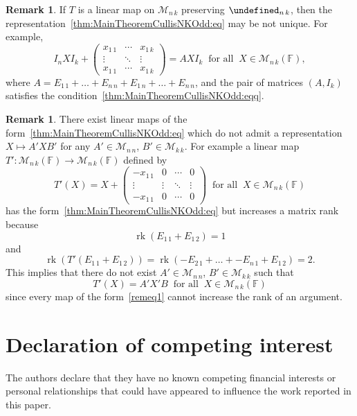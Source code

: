 \documentclass{elsarticle}
\DeclareMathOperator{\rk}{rk}
\def\F{{\mathbb F}}
\def\M{{\mathcal M}}
\let\det\undefined
\DeclareMathOperator{\det}{det}
\theoremstyle{plain}
\theoremstyle{definition}
\newtheorem{remark}[theorem]{Remark}
\numberwithin{equation}{section}
\begin{document}
\begin{remark}If $T$ is a linear map on $\M_{n\,k}$ preserving $\det_{n\,k}$, then the representation~\eqref{thm:MainTheoremCullisNKOdd:eq} may be not unique. For example,
\[
I_nXI_k + \begin{pmatrix}x_{1\,1} & \cdots & x_{1\,k} \\ \vdots & \ddots & \vdots\\ x_{1\,1} & \cdots & x_{1\,k}\end{pmatrix} = AXI_k\;\;\mbox{for all}\;\; X \in \M_{n\,k}(\F),
\]
where $A  = E_{1\,1} + \ldots + E_{n\,n} + E_{1\,n} + \ldots + E_{n\,n}$, and the pair of matrices $(A, I_k)$ satisfies the condition~\eqref{thm:MainTheoremCullisNKOdd:eqq}.
\end{remark}

\begin{remark}There exist linear maps of the form~\eqref{thm:MainTheoremCullisNKOdd:eq} which do not admit a representation $X \mapsto A'XB'$ for any $A' \in \M_{n\,n}$, $B' \in \M_{k\,k}$. For example a linear map $T'\colon \M_{n\,k}(\F) \to \M_{n\,k}(\F)$ defined by  
\[
T'(X) =  X + \begin{pmatrix}-x_{1\,1} & 0 & \cdots & 0\\ \vdots & \vdots & \ddots & \vdots\\ -x_{1\,1} & 0 & \cdots & 0
\end{pmatrix}\;\;\mbox{for all}\;\; X \in \M_{n\,k}(\F)
\]
has the form~\eqref{thm:MainTheoremCullisNKOdd:eq} but increases a matrix rank because
\[
\rk\left(E_{1\,1} + E_{1\,2}\right) = 1
\]
and
\[
\rk\left(T'(E_{1\,1} + E_{1\,2})\right) = \rk\left(-E_{2\,1} + \ldots + -E_{n\,1} + E_{1\,2}\right) = 2.
\]
This implies that there do not exist $A' \in \M_{n\,n}$, $B' \in \M_{k\,k}$ such that 
\begin{equation}\label{remeq1}
T'(X) = A'X'B\;\;\mbox{for all}\;\; X \in \M_{n\,k}(\F)
\end{equation}
since every map of the form~\eqref{remeq1} cannot increase the rank of an argument.
\end{remark}



\section*{Declaration of competing interest}

The authors declare that they have no known competing financial interests or personal relationships that could have appeared to influence the work reported in this paper.
\end{document}
